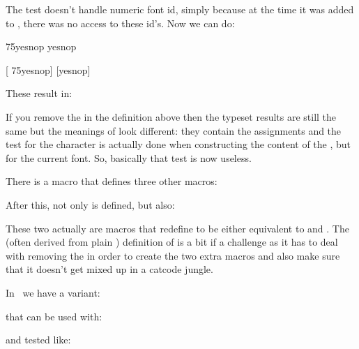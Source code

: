 \typebuffer[option=TEX] \getbuffer

The \type {\iffontchar} test doesn't handle numeric font id, simply because
at the time it was added to \ETEX, there was no access to these id's. Now we
can do:

\startbuffer
\edef\foo{ {75}yes\else nop\fi} \meaning\foo
\edef\foo{yes\else nop\fi} \meaning\foo

[\ifcondition{} {75}yes\else nop\fi]
[\ifcondition{}yes\else nop\fi]
\stopbuffer

\typebuffer[option=TEX]

These result in:

\startlines
\getbuffer
\stoplines

If you remove the \type {\immediateassignment} in the definition above then the
typeset results are still the same but the meanings of \type {\foo} look
different: they contain the assignments and the test for the character is
actually done when constructing the content of the \type {\edef}, but for the
current font. So, basically that test is now useless.

\stopsubsection

\startsubsection[title={User defined if's}]

There is a \type {\newif} macro that defines three other macros:

\starttyping[option=TEX]
\newif\ifOnMyOwnTerms
\stoptyping

After this, not only \type {\ifOnMyOwnTerms} is defined, but also:

\starttyping[option=TEX]
\OnMyOwnTermstrue
\OnMyOwnTermsfalse
\stoptyping

These two actually are macros that redefine \type {\ifOnMyOwnTerms} to be either
equivalent to \type {\iftrue} and \type {\iffalse}. The (often derived from plain
\TEX) definition of \type {\newif} is a bit if a challenge as it has to deal with
removing the  in order to create the two extra macros and also make
sure that it doesn't get mixed up in a catcode jungle.

In \CONTEXT\ we have a variant:

\starttyping[option=TEX]
\newconditional\MyConditional
\stoptyping

that can be used with:

\starttyping[option=TEX]
\settrue\MyConditional
\setfalse\MyConditional
\stoptyping

and tested like:

